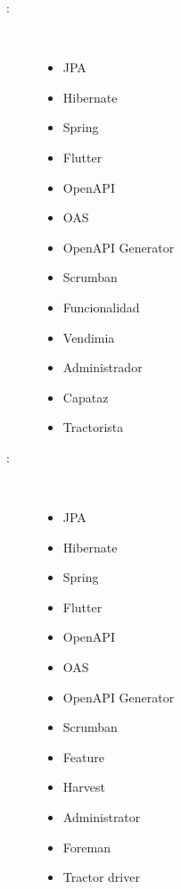 \begin{multicols}{2}
  \begin{description}
  \item [\palabraschaveprincipal:] \mbox{} \\[-20pt]
    \begin{itemize}
      \item JPA
      \item Hibernate
      \item Spring
      \item Flutter
      \item OpenAPI
      \item OAS
      \item OpenAPI Generator
      \item Scrumban
      \item Funcionalidad
      \item Vendimia
      \item Administrador
      \item Capataz
      \item Tractorista 
    \end{itemize}
  \end{description}
  \begin{description}
  \item [\palabraschavesecundaria:] \mbox{} \\[-20pt]
    \begin{itemize}
      \item JPA
      \item Hibernate
      \item Spring
      \item Flutter
      \item OpenAPI
      \item OAS
      \item OpenAPI Generator
      \item Scrumban
      \item Feature
      \item Harvest
      \item Administrator
      \item Foreman
      \item Tractor driver
    \end{itemize}

  \end{description}
  \end{multicols}
  